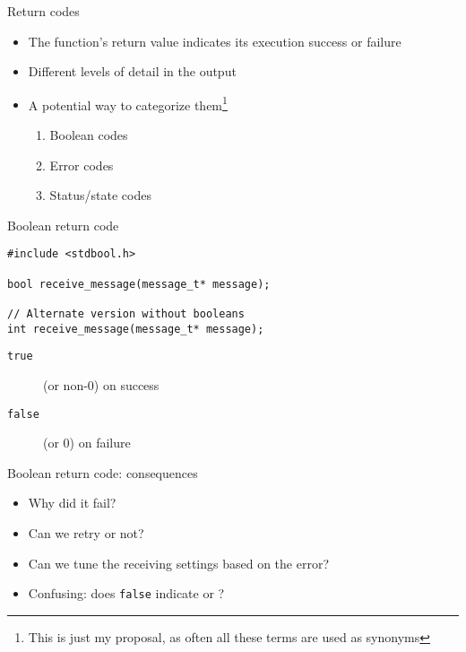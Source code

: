 \documentclass[aspectratio=169,14pt]{beamer}
\begin{document}
\begin{frame}{Return codes}
\begin{itemize}
    \item The function's return value indicates its execution success or failure
    \item Different levels of detail in the output
    \item A potential way to categorize them\footnote{This is just my proposal, as often all these terms are used as synonyms}
    \begin{enumerate}
        \item Boolean codes
        \item Error codes
        \item Status/state codes
    \end{enumerate}
\end{itemize}
\end{frame}



\begin{frame}[fragile]{Boolean return code}
\begin{lstlisting}[style=cstyle]
#include <stdbool.h>

bool receive_message(message_t* message);

// Alternate version without booleans
int receive_message(message_t* message);
\end{lstlisting}

\begin{description}
    \item[\texttt{true}] (or non-0) on success
    \item[\texttt{false}] (or 0) on failure
\end{description}
\end{frame}



\begin{frame}[fragile]{Boolean return code: consequences}
\begin{itemize}
    \item[\bad] Why did it fail?
    \item[\bad] Can we retry or not?
    \item[\bad] Can we tune the receiving settings based on the error?
    \item[\bad] Confusing: does \texttt{false} indicate  or ?
\end{itemize}
\end{frame}
\end{document}
